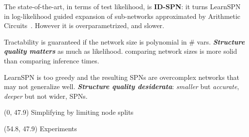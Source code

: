 \documentclass[final]{beamer}
\begin{document}
\begin{frame}{}
\begin{textblock}{25.2}

    The state-of-the-art, in terms of test likelihood, is \textbf{ID-SPN}: it turns LearnSPN in log-likelihood guided expansion of sub-networks
    approximated by Arithmetic
    Circuits~\emph{\parencite{Rooshenas2014-short}}. However it is
    overparametrized, and slower.\par\bigskip
    
    
    Tractability is guaranteed if the network size is polynomial in \#
    vars. \emph{\textbf{Structure quality matters}} as much as likelihood. comparing network sizes is more solid than comparing inference times.\par\bigskip

    LearnSPN is too greedy and the resulting SPNs are overcomplex
    networks that may not generalize well. \textbf{\emph{Structure quality desiderata}}: \emph{smaller} but \emph{accurate}, \emph{deeper} but not wider, SPNs. 

  \end{textblock}
  
  
  \begin{textblock}{80}(0, 47.9)
    Simplifying by limiting node splits
  \end{textblock}

  \begin{textblock}{20}(54.8, 47.9)
    Experiments
  \end{textblock}
  

\end{frame}
\end{document}
